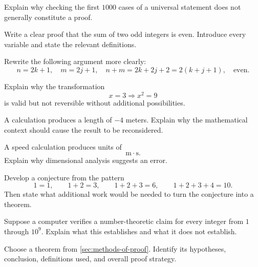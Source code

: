\begin{exercise}[2]
Explain why checking the first \(1000\) cases of a universal statement does
not generally constitute a proof.
\end{exercise}

\begin{exercise}[2]
Write a clear proof that the sum of two odd integers is even. Introduce every
variable and state the relevant definitions.
\end{exercise}

\begin{exercise}[2]
Rewrite the following argument more clearly:
\[ n=2k+1,\quad m=2j+1,\quad n+m=2k+2j+2=2(k+j+1),\quad\text{even}. \]
\end{exercise}

\begin{exercise}[2]
Explain why the transformation
\[ x=3\Longrightarrow x^2=9 \]
is valid but not reversible without additional possibilities.
\end{exercise}

\begin{exercise}[2]
A calculation produces a length of \(-4\) meters. Explain why the mathematical
context should cause the result to be reconsidered.
\end{exercise}

\begin{exercise}[2]
A speed calculation produces units of
\[ \mathrm{m}\cdot\mathrm{s}. \]
Explain why dimensional analysis suggests an error.
\end{exercise}

\begin{exercise}[3]
Develop a conjecture from the pattern
\[ 1=1,\qquad 1+2=3,\qquad 1+2+3=6,\qquad 1+2+3+4=10. \]
Then state what additional work would be needed to turn the conjecture into a
theorem.
\end{exercise}

\begin{exercise}[3]
Suppose a computer verifies a number-theoretic claim for every integer from
\(1\) through \(10^9\). Explain what this establishes and what it does not
establish.
\end{exercise}

\begin{exercise}[3]
Choose a theorem from \cref{sec:methods-of-proof}. Identify its hypotheses,
conclusion, definitions used, and overall proof strategy.
\end{exercise}

